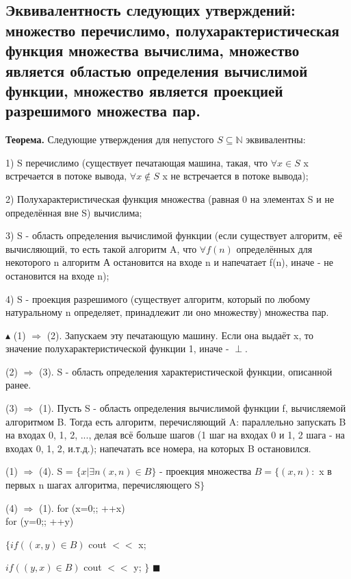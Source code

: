 \subsection{Эквивалентность следующих утверждений: множество перечислимо, полухарактеристическая функция множества вычислима, множество является областью
определения вычислимой функции, множество является проекцией разрешимого
множества пар.}

\textbf{Теорема.} Следующие утверждения для непустого $S \subseteq \mathbb{N}$ эквивалентны:

1) S перечислимо (существует печатающая машина, такая, что $\forall x \in S$ x встречается в потоке вывода, $\forall x \notin S$ x не встречается в потоке вывода);

2) Полухарактеристическая функция множества (равная 0 на элементах S и не определённая вне S) вычислима;

3) S - область определения вычислимой функции (если существует алгоритм, её вычисляющий, то
есть такой алгоритм A, что $\forall f(n)$ определённых для некоторого n алгоритм А остановится на входе n и напечатает f(n), иначе - не остановится на входе n);

4) S - проекция разрешимого (существует алгоритм, который по любому натуральному n определяет, принадлежит ли оно множеству) множества пар.

$\blacktriangle$
(1) $\Rightarrow$ (2). Запускаем эту печатающую машину. Если она выдаёт x, то значение полухарактеристической функции 1, иначе - $\perp$.

(2) $\Rightarrow$ (3). S - область определения характеристической функции, описанной ранее.

(3) $\Rightarrow$ (1). Пусть S - область определения вычислимой функции f, вычисляемой алгоритмом B. Тогда есть алгоритм, перечисляющий A: параллельно запускать B на входах 0, 1, 2, ..., делая всё больше шагов (1 шаг на входах 0 и 1, 2 шага - на входах 0, 1, 2, и.т.д.); напечатать все номера, на которых B остановился. 

(1) $\Rightarrow$ (4). S = $\{ x | \exists n (x, n) \in B\}$ - проекция множества $B = \{ (x, n):$ x в первых n шагах алгоритма, перечисляющего S$\}$

(4) $\Rightarrow$ (1). for (x=0;; ++x) \\
for (y=0;; ++y) 

    $\{ if ((x, y) \in B)$ cout $<<$ x;

    $if ((y, x) \in B)$ cout $<<$ y; $\}$
$\blacksquare$